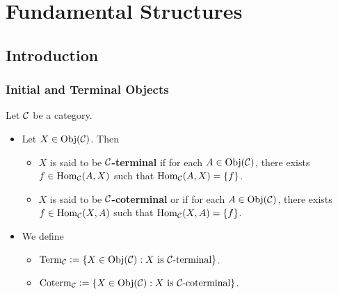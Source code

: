 \documentclass{book}
\begin{document}
	
	
	
	
	
	
	
	
	
	
	
	
	
	
	
	
	
	
	
	
	
	
	
	
	
	
	
	
	
	
	
	
	
	
	
	
	
	
	
	
	
	
	
	
	
	
	
	
	
	
	\newpage
	\part{Fundamental Structures}
	
	\chapter{Introduction}
	
	\section{Initial and Terminal Objects}
	
	\begin{defn} 
		Let $\mathcal{C}$ be a category.
		\begin{itemize}
			\item Let $X \in \operatorname{Obj}(\mathcal{C})$. Then 
			\begin{itemize}
				\item $X$ is said to be \textbf{$\mathcal{C}$-terminal} if for each $A \in \operatorname{Obj}(\mathcal{C})$, there exists $f \in \operatorname{Hom}_{\mathcal{C}}(A, X)$ such that $\operatorname{Hom}_{\mathcal{C}}(A, X) = \{f\}$.
				\item $X$ is said to be \textbf{$\mathcal{C}$-coterminal} or  if for each $A \in \operatorname{Obj}(\mathcal{C})$, there exists $f \in \operatorname{Hom}_{\mathcal{C}}(X, A)$ such that $\operatorname{Hom}_{\mathcal{C}}(X, A) = \{f\}$. 
			\end{itemize}
			\item We define 
			\begin{itemize}
				\item $\operatorname{\text{Term}}_{\mathcal{C}} \vcentcolon= \{X \in \operatorname{Obj}(\mathcal{C}): \text{$X$ is $\mathcal{C}$-terminal}\}$.
				\item $\operatorname{Coterm}_{\mathcal{C}} \vcentcolon= \{X \in \operatorname{Obj}(\mathcal{C}): \text{$X$ is $\mathcal{C}$-coterminal}\}$.
			\end{itemize}
		\end{itemize}
	\end{defn}
	
\end{document}
